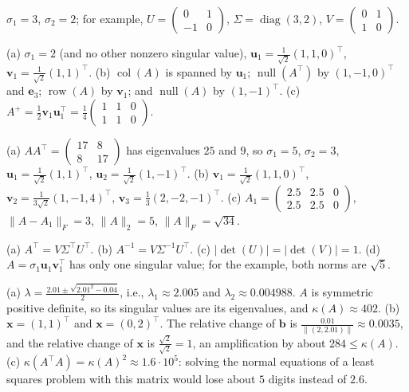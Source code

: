 \documentclass[11pt]{article}
\newcommand{\norm}[1]{\lVert #1 \rVert}
\DeclareMathOperator{\Null}{null}
\DeclareMathOperator{\col}{col}
\DeclareMathOperator{\row}{row}
\DeclareMathOperator{\diag}{diag}
\begin{document}
\begin{description}[leftmargin=0pt, itemsep=0.3em]
    \item[\ref{pr:svd-diag}.] $\sigma_1 = 3$, $\sigma_2 = 2$; for example, $U = \begin{pmatrix} 0 & 1 \\ -1 & 0 \end{pmatrix}$, $\Sigma = \diag(3, 2)$, $V = \begin{pmatrix} 0 & 1 \\ 1 & 0 \end{pmatrix}$.
    \item[\ref{pr:svd-rank1}.] (a) $\sigma_1 = 2$ (and no other nonzero singular value), $\mathbf{u}_1 = \frac{1}{\sqrt{2}}(1, 1, 0)^\top$, $\mathbf{v}_1 = \frac{1}{\sqrt{2}}(1, 1)^\top$. (b) $\col(A)$ is spanned by $\mathbf{u}_1$; $\Null(A^\top)$ by $(1, -1, 0)^\top$ and $\mathbf{e}_3$; $\row(A)$ by $\mathbf{v}_1$; and $\Null(A)$ by $(1, -1)^\top$. (c) $A^+ = \frac{1}{2} \mathbf{v}_1 \mathbf{u}_1^\top = \frac{1}{4}\begin{pmatrix} 1 & 1 & 0 \\ 1 & 1 & 0 \end{pmatrix}$.
    \item[\ref{pr:svd-2x3}.] (a) $AA^\top = \begin{pmatrix} 17 & 8 \\ 8 & 17 \end{pmatrix}$ has eigenvalues $25$ and $9$, so $\sigma_1 = 5$, $\sigma_2 = 3$, $\mathbf{u}_1 = \frac{1}{\sqrt{2}}(1, 1)^\top$, $\mathbf{u}_2 = \frac{1}{\sqrt{2}}(1, -1)^\top$. (b) $\mathbf{v}_1 = \frac{1}{\sqrt{2}}(1, 1, 0)^\top$, $\mathbf{v}_2 = \frac{1}{3\sqrt{2}}(1, -1, 4)^\top$, $\mathbf{v}_3 = \frac{1}{3}(2, -2, -1)^\top$. (c) $A_1 = \begin{pmatrix} 2.5 & 2.5 & 0 \\ 2.5 & 2.5 & 0 \end{pmatrix}$, $\norm{A - A_1}_F = 3$, $\norm{A}_2 = 5$, $\norm{A}_F = \sqrt{34}$.
    \item[\ref{pr:svd-props}.] (a) $A^\top = V\Sigma^\top U^\top$. (b) $A^{-1} = V \Sigma^{-1} U^\top$. (c) $|\det(U)| = |\det(V)| = 1$. (d) $A = \sigma_1 \mathbf{u}_1 \mathbf{v}_1^\top$ has only one singular value; for the example, both norms are $\sqrt{5}$.
    \item[\ref{pr:condition}.] (a) $\lambda = \frac{2.01 \pm \sqrt{2.01^2 - 0.04}}{2}$, i.e., $\lambda_1 \approx 2.005$ and $\lambda_2 \approx 0.004988$. $A$ is symmetric positive definite, so its singular values are its eigenvalues, and $\kappa(A) \approx 402$. (b) $\mathbf{x} = (1, 1)^\top$ and $\mathbf{x} = (0, 2)^\top$. The relative change of $\mathbf{b}$ is $\frac{0.01}{\norm{(2, 2.01)}} \approx 0.0035$, and the relative change of $\mathbf{x}$ is $\frac{\sqrt{2}}{\sqrt{2}} = 1$, an amplification by about $284 \leq \kappa(A)$. (c) $\kappa(A^\top A) = \kappa(A)^2 \approx 1.6 \cdot 10^5$: solving the normal equations of a least squares problem with this matrix would lose about $5$ digits instead of $2.6$.

\end{description}
\end{document}
